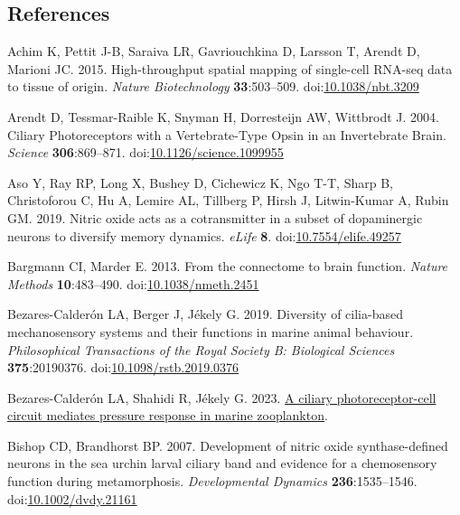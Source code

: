 \documentclass[
  10pt,
  onecolumn]{article}
\newlength{\cslhangindent}
\newlength{\cslentryspacingunit} %
\newenvironment{CSLReferences}[2] %
 {%
  \setlength{\parindent}{0pt}
  \ifodd #1
  \let\oldpar\par
  \def\par{\hangindent=\cslhangindent\oldpar}
  \fi
  \setlength{\parskip}{#2\cslentryspacingunit}
 }%
 {}
\begin{document}
\hypertarget{references}{%
\subsection*{References}\label{references}}

\hypertarget{refs}{}
\begin{CSLReferences}{1}{0}
\leavevmode{}%
Achim K, Pettit J-B, Saraiva LR, Gavriouchkina D, Larsson T, Arendt D,
Marioni JC. 2015. High-throughput spatial mapping of single-cell RNA-seq
data to tissue of origin. \emph{Nature Biotechnology}
\textbf{33}:503--509.
doi:\href{https://doi.org/10.1038/nbt.3209}{10.1038/nbt.3209}

\leavevmode{}%
Arendt D, Tessmar-Raible K, Snyman H, Dorresteijn AW, Wittbrodt J. 2004.
Ciliary Photoreceptors with a Vertebrate-Type Opsin in an Invertebrate
Brain. \emph{Science} \textbf{306}:869--871.
doi:\href{https://doi.org/10.1126/science.1099955}{10.1126/science.1099955}

\leavevmode{}%
Aso Y, Ray RP, Long X, Bushey D, Cichewicz K, Ngo T-T, Sharp B,
Christoforou C, Hu A, Lemire AL, Tillberg P, Hirsh J, Litwin-Kumar A,
Rubin GM. 2019. Nitric oxide acts as a cotransmitter in a subset of
dopaminergic neurons to diversify memory dynamics. \emph{eLife}
\textbf{8}.
doi:\href{https://doi.org/10.7554/elife.49257}{10.7554/elife.49257}

\leavevmode{}%
Bargmann CI, Marder E. 2013. From the connectome to brain function.
\emph{Nature Methods} \textbf{10}:483--490.
doi:\href{https://doi.org/10.1038/nmeth.2451}{10.1038/nmeth.2451}

\leavevmode{}%
Bezares-Calderón LA, Berger J, Jékely G. 2019. Diversity of cilia-based
mechanosensory systems and their functions in marine animal behaviour.
\emph{Philosophical Transactions of the Royal Society B: Biological
Sciences} \textbf{375}:20190376.
doi:\href{https://doi.org/10.1098/rstb.2019.0376}{10.1098/rstb.2019.0376}

\leavevmode{}%
Bezares-Calderón LA, Shahidi R, Jékely G. 2023.
\href{http://dx.doi.org/10.1101/2023.02.28.530398}{A ciliary
photoreceptor-cell circuit mediates pressure response in marine
zooplankton}.

\leavevmode{}%
Bishop CD, Brandhorst BP. 2007. Development of nitric oxide
synthase-defined neurons in the sea urchin larval ciliary band and
evidence for a chemosensory function during metamorphosis.
\emph{Developmental Dynamics} \textbf{236}:1535--1546.
doi:\href{https://doi.org/10.1002/dvdy.21161}{10.1002/dvdy.21161}


\end{CSLReferences}
\end{document}
